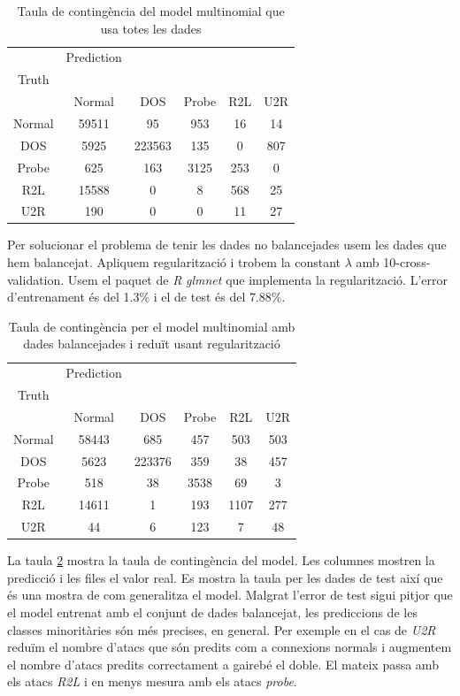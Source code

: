\documentclass[a4paper]{article} %
\begin{document}
\begin{table}[H]
	\centering
	\begin{tabular}{c | c c c c c}
		& Prediction\\
		Truth\\
		 & Normal & DOS & Probe & R2L & U2R \\
		\hline
		Normal	& 59511	& 95 	 & 953	 & 16 	& 14 \\
		DOS		& 5925	& 223563 & 135	 & 0  	& 807\\
		Probe	& 625	& 163	 & 3125	 & 253	& 0 \\
		R2L		& 15588	& 0		 & 8   & 568 	& 25\\
		U2R		& 190	& 0		 & 0    & 11 	& 27\\	
	\end{tabular}
	\caption{Taula de contingència del model multinomial que usa totes les dades}
	\label{table:unbModel}
\end{table}


Per solucionar el problema de tenir les dades no balancejades usem les dades que hem balancejat. Apliquem regularització i trobem la constant $\lambda$ amb 10-cross-validation. Usem el paquet de \textit{R} \textit{glmnet} \cite{glmnet} que implementa la regularització. L'error d'entrenament és del 1.3\% i el de test és del 7.88\%.


\begin{table}[H]
	\centering
	\begin{tabular}{c | c c c c c}
			& Prediction\\
		Truth\\
				& Normal & DOS & Probe & R2L & U2R \\
		\hline
		Normal	& 58443	& 685 	 & 457	 & 503 	& 503 \\
		DOS		& 5623	& 223376 & 359	 & 38  	& 457\\
		Probe	& 518	& 38	 & 3538	 & 69	&  3 \\
		R2L		& 14611	& 1		 & 193   & 1107 & 277\\
		U2R		& 44	& 6		 & 123    &  7 	& 48\\	
	\end{tabular}
	\caption{Taula de contingència per el model multinomial amb dades balancejades i reduït usant regularització}
	\label{table:sub10model}
\end{table}

La taula \ref{table:sub10model} mostra la taula de contingència del model. Les columnes mostren la predicció i les files el valor real. Es mostra la taula per les dades de test així que és una mostra de com generalitza el model. Malgrat l'error de test sigui pitjor que el model entrenat amb el conjunt de dades balancejat, les prediccions de les classes minoritàries són més precises, en general. Per exemple en el cas de \textit{U2R} reduïm el nombre d'atacs que són predits com a connexions normals i augmentem el nombre d'atacs predits correctament a gairebé el doble. El mateix passa amb els atacs \textit{R2L} i en menys mesura amb els atacs \textit{probe}.
\end{document}
